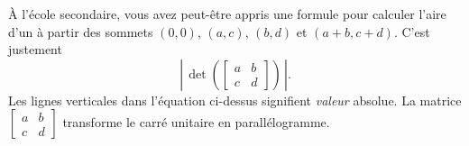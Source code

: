 À l'école secondaire, vous avez peut-être appris une formule pour calculer l'aire d'un  à partir des sommets
$(0,0)$, $(a,c)$, $(b,d)$
et $(a+b,c+d)$. C'est justement
\begin{equation*}
\left\lvert \, \det \left(
\begin{bmatrix} a & b \\ c & d \end{bmatrix}
\right) \, \right\lvert.
\end{equation*}
Les lignes verticales dans l'équation ci-dessus signifient \emph{valeur} absolue. La matrice $\left[ \begin{smallmatrix} a & b \\ c & d \end{smallmatrix}
\right]$
transforme le carré unitaire en parallélogramme.

\medskip

